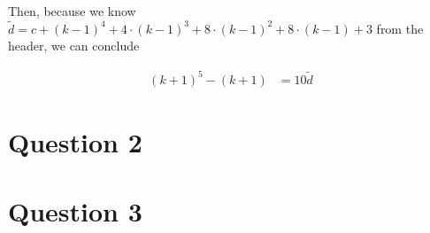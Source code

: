 \documentclass[12pt]{article}
\begin{document}
\begin{itemize}
\begin{itemize}
\begin{itemize}
\begin{mdframed}
\begin{enumerate}[1.]
\begin{mdframed}
                    \bigskip

                    Then, because we know $\tilde{d} = c + (k-1)^4 + 4 \cdot (k-1)^3 + 8 \cdot (k-1)^2 +
                    8 \cdot(k-1) + 3$ from the header, we can conclude

                    \begin{align}
                        (k+1)^5 - (k+1) &= 10 \tilde{d}
                    \end{align}

                    \end{mdframed}
                \end{enumerate}
            \end{mdframed}
        \end{itemize}
    \end{itemize}
\end{itemize}

\section*{Question 2}

\section*{Question 3}
\end{document}
